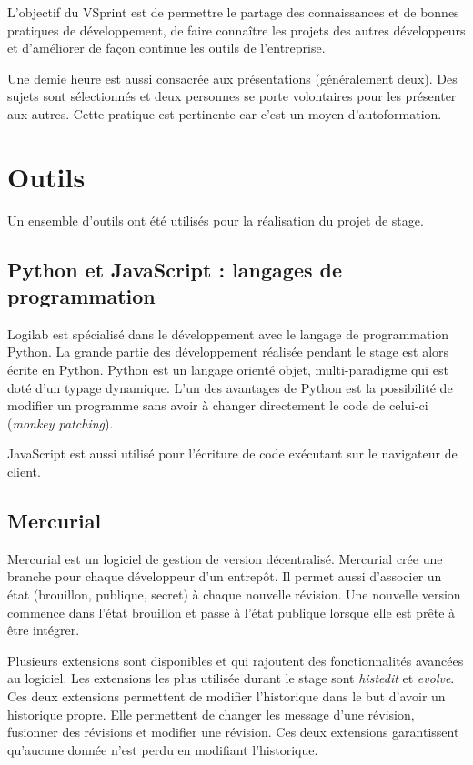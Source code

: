 L'objectif du VSprint est de permettre le partage des connaissances et de bonnes pratiques de développement, de faire connaître les projets des autres développeurs et d'améliorer de façon continue les outils de l'entreprise. 

Une demie heure est aussi consacrée aux présentations (généralement deux). Des sujets sont sélectionnés et deux personnes se porte volontaires pour les présenter aux autres. Cette pratique est pertinente car c'est un moyen d'autoformation.

\section{Outils}
Un ensemble d'outils ont été utilisés pour la réalisation du projet de stage. 

\subsection{Python et JavaScript : langages de programmation}
Logilab est spécialisé dans le développement avec le langage de programmation Python. La grande partie des développement réalisée pendant le stage est alors écrite en Python. Python est un langage orienté objet, multi-paradigme qui est doté d'un typage dynamique. L'un des avantages de Python est la possibilité de modifier un programme sans avoir à changer directement le code de celui-ci (\textit{monkey patching}).

JavaScript est aussi utilisé pour l'écriture de code exécutant sur le navigateur de client. 

\subsection{Mercurial}
Mercurial est un logiciel de gestion de version décentralisé. Mercurial crée une branche pour chaque développeur d'un entrepôt. Il permet aussi d'associer un état (brouillon, publique, secret) à chaque nouvelle révision. Une nouvelle version commence dans l'état brouillon et passe à l'état publique lorsque elle est prête à être intégrer. 

Plusieurs extensions sont disponibles et qui rajoutent des fonctionnalités avancées au logiciel. Les extensions les plus utilisée durant le stage sont \textit{histedit} et \textit{evolve}. Ces deux extensions permettent de modifier l'historique dans le but d'avoir un historique propre. Elle permettent de changer les message d'une révision, fusionner des révisions et modifier une révision. Ces deux extensions garantissent qu'aucune donnée n'est perdu en modifiant l'historique. 

